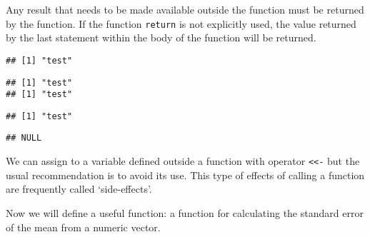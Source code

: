\documentclass[paper=a4,10pt,div=17,headsepline,BCOR=12mm,twoside,open=right]{scrbook}\usepackage{knitr}
\begin{document}
Any result that needs to be made available outside the function must be returned by the function. If the function \texttt{return} is not explicitly used, the value returned by the last statement within the body of the function will be returned.

\begin{knitrout}\footnotesize
{}\color{fgcolor}\begin{kframe}
\begin{alltt}
 \hlkwb{<-} \hlstd{(}\hlstd{)\{}
\hlstd{(}\hlstd{)}
\end{alltt}
\begin{verbatim}
## [1] "test"
\end{verbatim}
\begin{alltt}
 \hlkwb{<-} \hlstd{(}\hlstd{)\{} 
\hlstd{(}\hlstd{)}
\end{alltt}
\begin{verbatim}
## [1] "test"
## [1] "test"
\end{verbatim}
\begin{alltt}
 \hlkwb{<-} \hlstd{(}\hlstd{)\{} 
\hlstd{(}\hlstd{)}
\end{alltt}
\begin{verbatim}
## [1] "test"
\end{verbatim}
\begin{alltt}
 \hlkwb{<-} \hlstd{(}\hlstd{)\{}\hlstd{();} 
\hlstd{(}\hlstd{)}
\end{alltt}
\begin{verbatim}
## NULL
\end{verbatim}
\end{kframe}
\end{knitrout}

We can assign to a variable defined outside a function with operator \texttt{<<-} but the usual recommendation is to avoid its use. This type of effects of calling a function are frequently called `side-effects'.

Now we will define a useful function: a function for calculating the standard error of the mean from a numeric vector.
\end{document}
